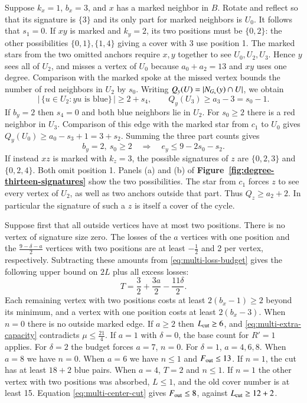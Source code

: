 Suppose $k_x=1$, $b_x=3$, and $x$ has a marked neighbor in $B$.
Rotate and reflect so that its signature is $\{3\}$ and its only part
for marked neighbors is $U_0$. It follows that $s_1=0$. If $xy$ is marked and
$k_y=2$, its two positions must be $\{0,2\}$: the other possibilities
$\{0,1\},\{1,4\}$ giving a cover with $3$ use position 1.
The marked stars from the two omitted anchors require $x,y$ together
to see $U_0,U_2,U_3$. Hence $y$ sees all of $U_2$, and misses a
vertex of $U_0$ because $a_0+a_2=13$ and $xy$ uses one degree.
Comparison with the marked spoke at the missed vertex bounds the
number of red neighbors in $U_2$ by $s_0$. Writing $Q_y(U)=
|N_{G_{\rm s}}(y)\cap U|$, we obtain
\begin{equation}\label{eq:d13-two-positions}
 |\,\{u\in U_2:yu\text{ is blue}\}\,|\ge2+s_4,\qquad
 Q_y(U_3)\ge a_3-3=s_0-1.
\end{equation}
If $b_y=2$ then $s_4=0$ and both blue neighbors lie in $U_2$.
For $s_0\ge2$ there is a red neighbor in $U_3$. Comparison of this
edge with the marked star from $c_1$ to $U_0$ gives
$Q_y(U_0)\ge a_0-s_3+1=3+s_2$. Summing the three part counts gives
\begin{equation}\label{eq:d13-outside-degree}
 b_y=2,\ s_0\ge2\quad\Longrightarrow\quad e_y\le9-2s_0-s_2 .
\end{equation}
If instead $xz$ is marked with $k_z=3$, the possible signatures
of $z$ are $\{0,2,3\}$ and $\{0,2,4\}$. Both omit position 1.
Panels (a) and (b) of \textbf{Figure~\ref{fig:degree-thirteen-signatures}}
show the two possibilities.
The star from $c_1$ forces $z$ to see every vertex of $U_2$, as
well as two anchors outside that part. Thus $Q_z\ge a_2+2$.
In particular the signature of such a $z$ is itself a cover of the cycle.

Suppose first that all outside vertices have at most two positions.
There is no vertex of signature size zero. The losses of the $a$
vertices with one position and the $\frac{9-\delta-a}{2}$ vertices with
two positions are at least $-\frac{1}{2}$ and 2 per vertex, respectively.
Subtracting these amounts from \eqref{eq:multi-loss-budget} gives
the following upper bound on $2L$ plus all excess losses:
\[
 T=\frac{3}{2}+\frac{3a}{2}-\frac{11\delta}{2}.
\]
Each remaining vertex with two positions costs at least
$2(b_x-1)\ge2$ beyond its minimum, and a vertex with one position
costs at least $2(b_x-3)$. When $n=0$ there is no outside marked
edge. If $a\ge2$ then $L_{\rm cut}\ge6$, and
\eqref{eq:multi-extra-capacity} contradicts $\mu\le\frac{21}{4}$. If $a=1$
with $\delta=0$, the base count for $R'=1$ applies.
For $\delta=2$ the budget forces $a=7$, $n=0$.
For $\delta=1$, $a=4,6,8$. When $a=8$ we have $n=0$. When $a=6$
we have $n\le1$ and $F_{\rm out}\le13$. If $n=1$, the cut
has at least $18+2$ blue pairs. When $a=4$, $T=2$ and $n\le1$.
If $n=1$ the other vertex with two positions was absorbed, $L\le1$,
and the old cover number is at least 15. Equation
\eqref{eq:multi-center-cut} gives $F_{\rm out}\le8$, against
$L_{\rm cut}\ge12+2$.

